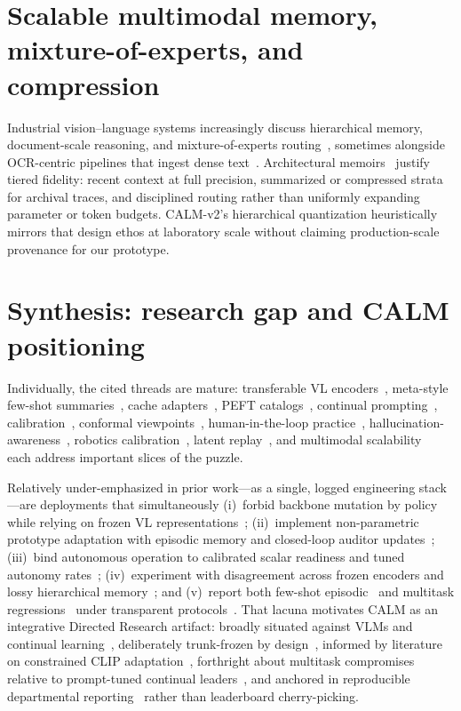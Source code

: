 \documentclass[12pt,a4paper]{report}
\begin{document}
\section{Scalable multimodal memory, mixture-of-experts, and compression}
Industrial vision--language systems increasingly discuss hierarchical memory, document-scale reasoning, and mixture-of-experts routing~\cite{r32}, sometimes alongside OCR-centric pipelines that ingest dense text~\cite{r31}. Architectural memoirs~\cite{r31,r32} justify tiered fidelity: recent context at full precision, summarized or compressed strata for archival traces, and disciplined routing rather than uniformly expanding parameter or token budgets. CALM-v2's hierarchical quantization heuristically mirrors that design ethos at laboratory scale without claiming production-scale provenance for our prototype.

\section{Synthesis: research gap and CALM positioning}
Individually, the cited threads are mature: transferable VL encoders~\cite{r1,r27}, meta-style few-shot summaries~\cite{r3}, cache adapters~\cite{r4}, PEFT catalogs~\cite{r12,r13,r14,r15}, continual prompting~\cite{r8,r17,r19}, calibration~\cite{r5,r26}, conformal viewpoints~\cite{r10,r21}, human-in-the-loop practice~\cite{r24}, hallucination-awareness~\cite{r23}, robotics calibration~\cite{r25}, latent replay~\cite{r9}, and multimodal scalability~\cite{r31,r32} each address important slices of the puzzle.

Relatively under-emphasized in prior work---as a single, logged engineering stack---are deployments that simultaneously (i)~forbid backbone mutation by policy while relying on frozen VL representations~\cite{r1}; (ii)~implement non-parametric prototype adaptation with episodic memory and closed-loop auditor updates~\cite{r3,r7,r24}; (iii)~bind autonomous operation to calibrated scalar readiness and tuned autonomy rates~\cite{r5,r10}; (iv)~experiment with disagreement across frozen encoders and lossy hierarchical memory~\cite{r21,r31,r32}; and (v)~report both few-shot episodic~\cite{r2,r3,r4} and multitask regressions~\cite{r7,r8} under transparent protocols~\cite{r19}. That lacuna motivates CALM as an integrative Directed Research artifact: broadly situated against VLMs and continual learning~\cite{r18,r27}, deliberately trunk-frozen by design~\cite{r1}, informed by literature on constrained CLIP adaptation~\cite{r16}, forthright about multitask compromises relative to prompt-tuned continual leaders~\cite{r8,r17}, and anchored in reproducible departmental reporting~\cite{r19} rather than leaderboard cherry-picking.
\end{document}

